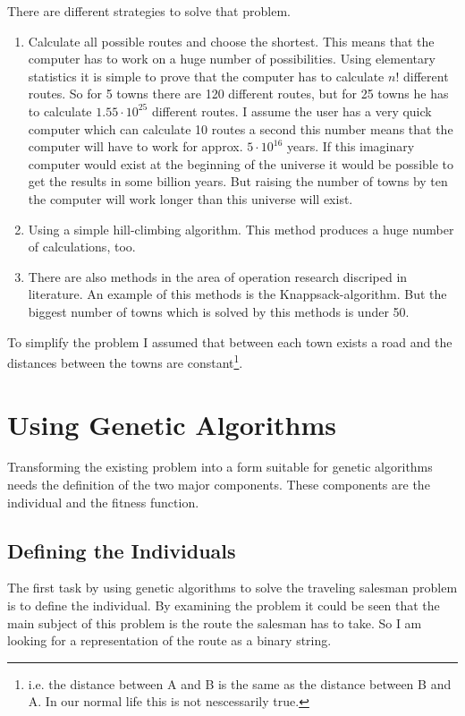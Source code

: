 There are different strategies to solve that problem.
\begin{enumerate}
  \item Calculate all possible routes and choose the shortest. This means that
  the computer has to work on a huge number of possibilities. Using elementary
  statistics it is simple to prove that the computer has to calculate $n!$ different
  routes. So for 5 towns there are 120 different routes, but for 25 towns he
  has to calculate $1.55 \cdot 10^{25}$ different routes. I assume the user
  has a very quick computer which can calculate 10 routes a second this number
  means that the computer will have to work for approx. $5 \cdot 10^{16}$ years.
  If this imaginary computer would exist at the beginning of the universe it would
  be possible to get the results in some billion years. But raising the number of
  towns by ten the computer will work longer than this universe will exist.
  \item Using a simple hill-climbing algorithm. This method produces a huge
  number of calculations, too.
  \item There are also methods in the area of operation research discriped in
  literature. An example of this methods is the Knappsack-algorithm. But the
  biggest number of towns which is solved by this methods is under 50.
\end{enumerate}
To simplify the problem I assumed that between each town exists a road and the
distances between the towns are constant\footnote{i.e. the distance between A and
B is the same as the distance between B and A. In our normal life this is not
nescessarily true.}.
\section{Using Genetic Algorithms}
Transforming the existing problem into a form suitable for genetic algorithms
needs the definition of the two major components. These components are the individual
and the fitness function.
\subsection{Defining the Individuals}
The first task by using genetic algorithms to solve the traveling salesman problem
is to define the individual. By examining the problem it could be seen that the
main subject of this problem is the route the salesman has to take. So I am looking for
a representation of the route as a binary string.

